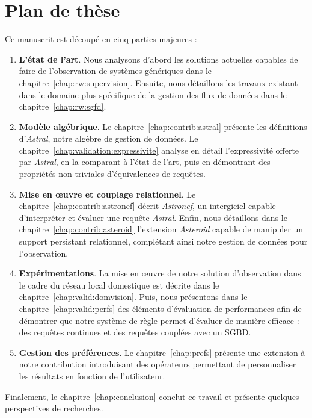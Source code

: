\section{Plan de thèse}\label{sec:intro:plan}
Ce manuscrit est découpé en cinq parties majeures :
\begin{enumerate}
\item \textbf{L'état de l'art}. Nous analysons d'abord les solutions actuelles capables de faire de l'observation de systèmes génériques dans le chapitre~\ref{chap:rw:supervision}. Ensuite, nous détaillons les travaux existant dans le domaine plus spécifique de la gestion des flux de données dans le chapitre~\ref{chap:rw:sgfd}.
\item \textbf{Modèle algébrique}. Le chapitre~\ref{chap:contrib:astral} présente les définitions d'\textit{Astral}, notre algèbre de gestion de données. Le chapitre~\ref{chap:validation:expressivite} analyse en détail l'expressivité offerte par \textit{Astral}, en la comparant à l'état de l'art, puis en démontrant des propriétés non triviales d'équivalences de requêtes. 
\item \textbf{Mise en œuvre et couplage relationnel}. Le chapitre~\ref{chap:contrib:astronef} décrit \textit{Astronef}, un intergiciel capable d'interpréter et évaluer une requête \textit{Astral}. Enfin, nous détaillons dans le chapitre~\ref{chap:contrib:asteroid} l'extension \textit{Asteroid} capable de manipuler un support persistant relationnel, complétant ainsi notre gestion de données pour l'observation.
\item \textbf{Expérimentations}. La mise en œuvre de notre solution d'observation dans le cadre du réseau local domestique est décrite dans le chapitre~\ref{chap:valid:domvision}. Puis, nous présentons dans le chapitre~\ref{chap:valid:perfs} des éléments d'évaluation de performances afin de démontrer que notre système de règle permet d'évaluer de manière efficace : des requêtes continues et des requêtes couplées avec un SGBD.
\item \textbf{Gestion des préférences}. Le chapitre~\ref{chap:prefs} présente une extension à notre contribution introduisant des opérateurs permettant de personnaliser les résultats en fonction de l'utilisateur.
\end{enumerate}

Finalement, le chapitre~\ref{chap:conclusion} conclut ce travail et présente quelques perspectives de recherches.